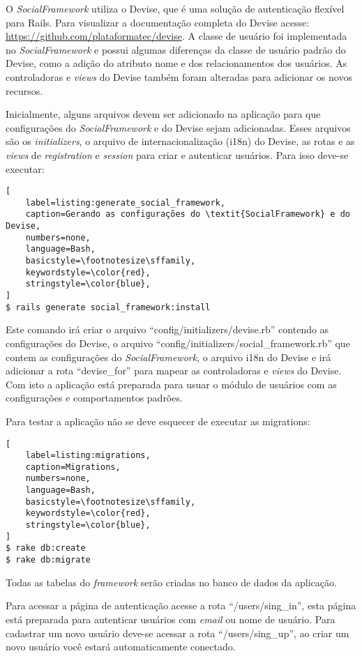 O \textit{SocialFramework} utiliza o Devise, que é uma solução de autenticação flexível para Rails. Para visualizar a documentação completa do Devise acesse: \url{https://github.com/plataformatec/devise}. A classe de usuário foi implementada no \textit{SocialFramework} e possui algumas diferenças da classe de usuário padrão do Devise, como a adição do atributo nome e dos relacionamentos dos usuários. As controladoras e \textit{views} do Devise também foram alteradas para adicionar os novos recursos.

Inicialmente, alguns arquivos devem ser adicionado na aplicação para que configurações do \textit{SocialFramework} e do Devise sejam adicionadas. Esses arquivos são os \textit{initializers}, o arquivo de internacionalização (i18n) do Devise, as rotas e as \textit{views} de \textit{registration} e \textit{session} para criar e autenticar usuários. Para isso deve-se executar:

\begin{lstlisting}[
    label=listing:generate_social_framework,
    caption=Gerando as configurações do \textit{SocialFramework} e do Devise,
    numbers=none,
    language=Bash,
    basicstyle=\footnotesize\sffamily,
    keywordstyle=\color{red},
    stringstyle=\color{blue},
]
$ rails generate social_framework:install
\end{lstlisting}

Este comando irá criar o arquivo ``config/initializers/devise.rb'' contendo as configurações do Devise, o arquivo ``config/initializers/social\_framework.rb'' que contem as configurações do \textit{SocialFramework}, o arquivo i18n do Devise e irá adicionar a rota ``devise\_for'' para mapear as controladoras e \textit{views} do Devise. Com isto a aplicação está preparada para usuar o módulo de usuários com as configurações e comportamentos padrões.

Para testar a aplicação não se deve esquecer de executar as migrations:

\begin{lstlisting}[
    label=listing:migrations,
    caption=Migrations,
    numbers=none,
    language=Bash,
    basicstyle=\footnotesize\sffamily,
    keywordstyle=\color{red},
    stringstyle=\color{blue},
]
$ rake db:create
$ rake db:migrate
\end{lstlisting}

Todas as tabelas do \textit{framework} serão criadas no banco de dados da aplicação.

Para acessar a página de autenticação acesse a rota ``/users/sing\_in'', esta página está preparada para autenticar usuários com \textit{email} ou nome de usuário. Para cadastrar um novo usuário deve-se acessar a rota ``/users/sing\_up'', ao criar um novo usuário você estará automaticamente conectado.


